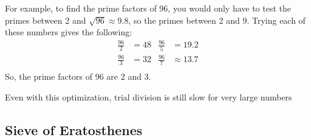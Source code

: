 \documentclass[12pt, titlepage]{article}
\begin{document}
For example, to find the prime factors of 96, you would only have to test the primes between
2 and $\sqrt{96} \approx 9.8$, so the primes between 2 and 9. Trying each of these numbers
gives the following:
%
\begin{align*}
    \frac{96}{2} &= 48 &\frac{96}{5} &= 19.2 \\
    \frac{96}{3} &= 32 &\frac{96}{7} &\approx 13.7\\
\end{align*}
%
So, the prime factors of 96 are 2 and 3.

Even with this optimization, trial division is still slow for very large numbers 

\subsection{Sieve of Eratosthenes}
\end{document}
